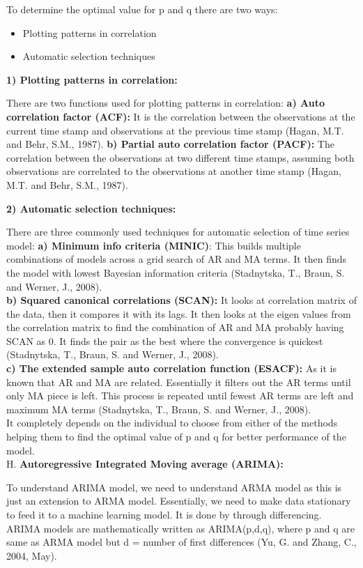 \documentclass[10pt]{report}
\begin{document}
\begin{flushleft}
		To determine the optimal value for p and q there are two ways:
		\begin{itemize}
	    \item	Plotting patterns in correlation
		\item	Automatic selection techniques
		\end{itemize}
		\textbf{1) Plotting patterns in correlation: }
		
		There are two functions used for plotting patterns in correlation:
		\textbf{a)	Auto correlation factor (ACF):} It is the correlation between the observations at the current time stamp and observations at the previous time stamp (Hagan, M.T. and Behr, S.M., 1987). 
		\textbf{b)	Partial auto correlation factor (PACF):} The correlation between the observations at two different time stamps, assuming both observations are correlated to the observations at another time stamp (Hagan, M.T. and Behr, S.M., 1987). 
		
		\textbf{2) Automatic selection techniques: }
		
		There are three commonly used techniques for automatic selection of time series model:
		\textbf{a)	Minimum info criteria (MINIC)}: This builds multiple combinations of models across a grid search of AR and MA terms. It then finds the model with lowest Bayesian information criteria (Stadnytska, T., Braun, S. and Werner, J., 2008). \\
		\textbf{b)	Squared canonical correlations (SCAN):} It looks at correlation matrix of the data, then it compares it with its lags. It then looks at the eigen values from the correlation matrix to find the combination of AR and MA probably having SCAN as 0. It finds the pair as the best where the convergence is quickest (Stadnytska, T., Braun, S. and Werner, J., 2008).\\
		\textbf{c)	The extended sample auto correlation function (ESACF):} As it is known that AR and MA are related. Essentially it filters out the AR terms until only MA piece is left. This process is repeated until fewest AR terms are left and maximum MA terms (Stadnytska, T., Braun, S. and Werner, J., 2008).\\
		It completely depends on the individual to choose from either of the methods helping them to find the optimal value of p and q for better performance of the model.\\
		
		H.	\textbf{Autoregressive Integrated Moving average (ARIMA):}
		
		To understand ARIMA model, we need to understand ARMA model as this is just an extension to ARMA model. Essentially, we need to make data stationary to feed it to a machine learning model. It is done by through differencing. ARIMA models are mathematically written as ARIMA(p,d,q), where p and q are same as ARMA model but d = number of first differences (Yu, G. and Zhang, C., 2004, May). 
		

\end{flushleft}
\end{document}
